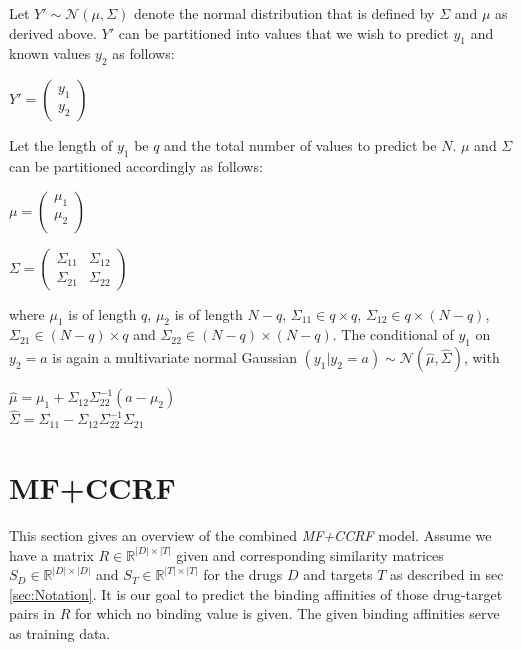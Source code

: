 Let $Y' \sim \mathcal{N}(\mu, \Sigma)$ denote the normal distribution that is defined by $\Sigma$ and $\mu$ as derived above.
$Y'$ can be partitioned into values that we wish to predict $y_1$ and known values $y_2$ as follows:
\begin{center}
$Y' = \begin{pmatrix}
y_1 \\
y_2
\end{pmatrix}$
\end{center}
Let the length of $y_1$ be $q$ and the total number of values to predict be $N$. $\mu$ and $\Sigma$ can be partitioned accordingly as follows:
\begin{center}
$\mu=\begin{pmatrix}
\mu_1\\
\mu_2\\
\end{pmatrix}$
\end{center}
\begin{center}
$\Sigma = \begin{pmatrix}
\Sigma_{11} & \Sigma_{12} \\
\Sigma_{21} & \Sigma_{22}
\end{pmatrix}$
\end{center}
where $\mu_1$ is of length $q$, $\mu_2$ is of length $N-q$, $\Sigma_{11}\in q \times q$, $\Sigma_{12} \in q \times (N-q)$, $\Sigma_{21} \in (N-q) \times q$ and $\Sigma_{22} \in (N-q) \times (N-q)$. The conditional of $y_1$ on $y_2=a$ is again a multivariate normal Gaussian $(y_1 | y_2 = a) \sim \mathcal{N} (\hat{\mu}, \hat{\Sigma})$, with
\begin{center}
$\hat{\mu} = \mu_1 + \Sigma_{12}\Sigma_{22}^{-1}(a-\mu_2)$\\
$\hat{\Sigma} = \Sigma_{11} - \Sigma_{12}\Sigma_{22}^{-1}\Sigma_{21}$
\end{center}




\section{MF+CCRF}
\label{sec:MFCCRF}

This section gives an overview of the combined \textit{MF+CCRF} model. Assume we have a matrix $R \in \mathbb{R} ^{|D| \times |T|}$ given and corresponding similarity matrices $S_D \in \mathbb{R}^{|D| \times |D|}$ and $S_T \in \mathbb{R}^{|T| \times |T|}$ for the drugs $D$ and targets $T$ as described in sec \ref{sec:Notation}. It is our goal to predict the binding affinities of those drug-target pairs in $R$ for which no binding value is given. The given binding affinities serve as training data.


